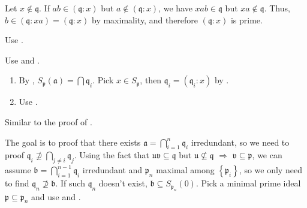 \begin{exercise}\label{ex4.14}
	Let $x\notin\mathfrak{q}$. If $ab\in(\mathfrak{q}:x)$ but $a\notin(\mathfrak{q}:x)$, we have $xab\in\mathfrak{q}$ but $xa\notin\mathfrak{q}$. Thus, $b\in(\mathfrak{q}:xa)=(\mathfrak{q}:x)$ by maximality, and therefore $(\mathfrak{q}:x)$ is prime.
\end{exercise}

\begin{exercise}\label{ex4.15}
	Use .
\end{exercise}

\begin{exercise}\label{ex4.16}
	Use  and .
\end{exercise}

\begin{exercise}\label{ex4.17}
	
\end{exercise}

\begin{exercise}\label{ex4.18}
	\begin{enumerate}
		\item[(i) $\Rightarrow$ (L1)] By , $S_\mathfrak{p}(\mathfrak{a})=\bigcap\mathfrak{q}_i$. Pick $x\in S_\mathfrak{p}$, then $\mathfrak{q}_i=\left(\mathfrak{q}_i:x\right)$ by .
		\item[(i) $\Rightarrow$ (L2)] Use .
	\end{enumerate}
\end{exercise}

\begin{exercise}\label{ex4.19}
	Similar to the proof of .
	
	The goal is to proof that there exists $\mathfrak{a}=\bigcap_{i=1}^n\mathfrak{q}_i$ irredundant, so we need to proof $\mathfrak{q}_i\nsupseteq\bigcap_{j\neq i}\mathfrak{q}_j$. Using the fact that $\mathfrak{uv}\subseteq\mathfrak{q}$ but $\mathfrak{u}\nsubseteq\mathfrak{q}$ $\Rightarrow$ $\mathfrak{v}\subseteq\mathfrak{p}$, we can assume $\mathfrak{b}=\bigcap_{i=1}^{n-1}\mathfrak{q}_i$ irredundant and $\mathfrak{p}_n$ maximal among $\left\{\mathfrak{p}_i\right\}$, so we only need to find $\mathfrak{q}_n\nsupseteq\mathfrak{b}$. If such $\mathfrak{q}_n$ doesn't exist, $\mathfrak{b}\subseteq S_{\mathfrak{p}_n}(0)$. Pick a minimal prime ideal $\mathfrak{p}\subseteq\mathfrak{p}_n$ and use  and .
\end{exercise}

\begin{exercise}\label{ex4.20}
	
\end{exercise}

\begin{exercise}\label{ex4.21}
	
\end{exercise}

\begin{exercise}\label{ex4.22}
	
\end{exercise}

\begin{exercise}\label{ex4.23}
	
\end{exercise}
